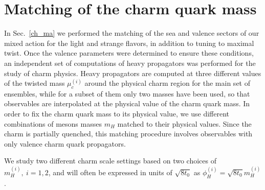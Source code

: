 \section{Matching of the charm quark mass}
\label{sec:matching_charm}

In Sec.~\ref{ch_ma} we performed the matching of the sea and valence sectors of our mixed action for the light and strange flavors, in addition to tuning to maximal twist. Once the valence parameters were determined to ensure these conditions, an independent set of computations of heavy propagators was performed for the study of charm physics. Heavy propagators are computed at three different values of the twisted  mass $\mu_c^{(i)}$ around the physical charm region for the main set of ensembles, while for a subset of them only two masses have been used, so that observables are interpolated at the physical value of the charm quark mass. In order to fix the charm quark mass to its physical value, we use different combinations of mesons masses $m_H$ matched to their physical values. Since the charm is partially quenched, this matching procedure involves observables with only valence charm quark propagators. 
%

We study two different charm scale settings based on two choices of $m_H^{(i)},~i=1,2$, and will often be expressed in units of $\sqrt{8t_0}$ as $\phi_H^{(i)} = \sqrt{8t_0}m_H^{(i)}$.
%


